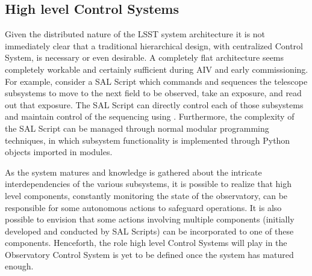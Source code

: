 \subsection{High level Control Systems} \label{sect:ocs}
Given the distributed nature of the LSST system architecture it is not immediately clear that a traditional hierarchical design, 
with centralized Control System, is necessary or even desirable. A completely flat architecture seems completely workable and 
certainly sufficient during AIV and early commissioning. For example, consider a SAL Script which commands and sequences 
the telescope subsystems to move to the next field to be observed, take an exposure, and read out that exposure. The SAL Script 
can directly control each of those subsystems and maintain control of the sequencing using \asyncio. Furthermore, the complexity of 
the SAL Script can be managed through normal modular programming techniques, in which subsystem functionality is 
implemented through Python objects imported in modules.

As the system matures and knowledge is gathered about the intricate interdependencies of the various subsystems, it is possible to 
realize  that high level components, constantly monitoring the state of the observatory, can be responsible for some autonomous actions 
to safeguard operations. It is also possible to envision that some actions involving multiple components (initially developed and 
conducted by SAL Scripts) can be incorporated to one of these components. Henceforth, the role high level Control Systems will play in 
the Observatory Control System is yet to be defined once the system has matured enough.


